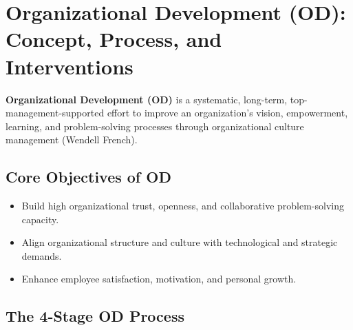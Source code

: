 \documentclass[12pt,a4paper]{article}
\begin{document}
\section{Organizational Development (OD): Concept, Process, and Interventions}

\begin{tcolorbox}[defbox, title={Definition of Organizational Development (OD)}]
  \textbf{Organizational Development (OD)} is a systematic, long-term, top-management-supported effort to improve an organization's vision, empowerment, learning, and problem-solving processes through organizational culture management (Wendell French).
\end{tcolorbox}

\subsection{Core Objectives of OD}
\begin{itemize}[leftmargin=*, itemsep=3pt]
  \item Build high organizational trust, openness, and collaborative problem-solving capacity.
  \item Align organizational structure and culture with technological and strategic demands.
  \item Enhance employee satisfaction, motivation, and personal growth.
\end{itemize}

\subsection{The 4-Stage OD Process}

\begin{tcolorbox}[tikzbox, title={The 4-Stage OD Process}]
\centering
{}
\end{tcolorbox}
\end{document}
